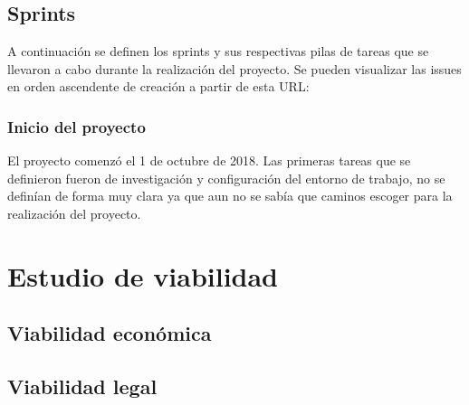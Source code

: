 \subsection{Sprints}
A continuación se definen los sprints y sus respectivas pilas de tareas que se llevaron a cabo durante la realización del proyecto. 
Se pueden visualizar las issues en orden ascendente de creación a partir de esta URL:

\subsubsection{Inicio del proyecto}
El proyecto comenzó el 1 de octubre de 2018. Las primeras tareas que se definieron fueron de investigación y configuración del entorno de trabajo, no se definían de forma muy clara ya que aun no se sabía que caminos escoger para la realización del proyecto.

\section{Estudio de viabilidad}

\subsection{Viabilidad económica}

\subsection{Viabilidad legal}


